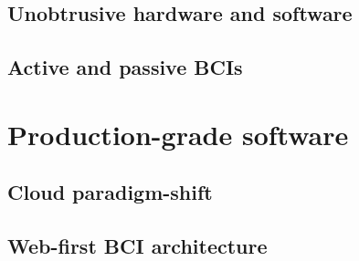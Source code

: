 




\subsection{Unobtrusive hardware and software}
\label{chapter2-unobtrusive-hardware-and-software}


\subsection{Active and passive BCIs}
\label{chapter2-active-and-passive-bcis}


\section{Production-grade software}
\label{chapter2-production-grade-software}


\subsection{Cloud paradigm-shift}
\label{chapter2-cloud-paradigm-shift}


\subsection{Web-first BCI architecture}
\label{chapter2-web-first-bci-architecture}

